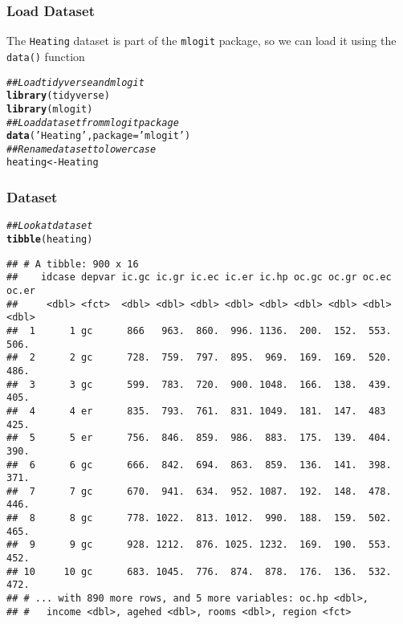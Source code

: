 \documentclass{beamer}\usepackage[]{graphicx}\usepackage[]{color}
\makeatletter
\newcommand{\hlstr}[1]{\textcolor[rgb]{0.192,0.494,0.8}{#1}}%
\newcommand{\hlcom}[1]{\textcolor[rgb]{0.678,0.584,0.686}{\textit{#1}}}%
\newcommand{\hlstd}[1]{\textcolor[rgb]{0.345,0.345,0.345}{#1}}%
\newcommand{\hlkwb}[1]{\textcolor[rgb]{0.69,0.353,0.396}{#1}}%
\newcommand{\hlkwc}[1]{\textcolor[rgb]{0.333,0.667,0.333}{#1}}%
\newcommand{\hlkwd}[1]{\textcolor[rgb]{0.737,0.353,0.396}{\textbf{#1}}}%
\newenvironment{kframe}{%
 \def\at@end@of@kframe{}%
 \ifinner\ifhmode%
  \def\at@end@of@kframe{\end{minipage}}%
  \begin{minipage}{\columnwidth}%
 \fi\fi%
 \def\FrameCommand##1{\hskip\@totalleftmargin \hskip-\fboxsep
 \colorbox{shadecolor}{##1}\hskip-\fboxsep
     \hskip-\linewidth \hskip-\@totalleftmargin \hskip\columnwidth}%
 \MakeFramed {\advance\hsize-\width
   \@totalleftmargin\z@ \linewidth\hsize
   \@setminipage}}%
 {\par\unskip\endMakeFramed%
 \at@end@of@kframe}
\newenvironment{knitrout}{}{} %
\makeatother
\begin{document}
\begin{frame}[fragile]\frametitle{Load Dataset}
    The \texttt{Heating} dataset is part of the \texttt{mlogit} package, so we can load it using the \texttt{data()} function \\
\begin{knitrout}\footnotesize
{}\color{fgcolor}\begin{kframe}
\begin{alltt}
\hlcom{## Load tidyverse and mlogit}
\hlkwd{library}\hlstd{(tidyverse)}
\hlkwd{library}\hlstd{(mlogit)}
\hlcom{## Load dataset from mlogit package}
\hlkwd{data}\hlstd{(}\hlstr{'Heating'}\hlstd{,} \hlkwc{package} \hlstd{=} \hlstr{'mlogit'}\hlstd{)}
\hlcom{## Rename dataset to lowercase}
\hlstd{heating} \hlkwb{<-} \hlstd{Heating}
\end{alltt}
\end{kframe}
\end{knitrout}
\end{frame}

\begin{frame}[fragile]\frametitle{Dataset}
\begin{knitrout}\footnotesize
{}\color{fgcolor}\begin{kframe}
\begin{alltt}
\hlcom{## Look at dataset}
\hlkwd{tibble}\hlstd{(heating)}
\end{alltt}
\begin{verbatim}
## # A tibble: 900 x 16
##    idcase depvar ic.gc ic.gr ic.ec ic.er ic.hp oc.gc oc.gr oc.ec oc.er
##     <dbl> <fct>  <dbl> <dbl> <dbl> <dbl> <dbl> <dbl> <dbl> <dbl> <dbl>
##  1      1 gc      866   963.  860.  996. 1136.  200.  152.  553.  506.
##  2      2 gc      728.  759.  797.  895.  969.  169.  169.  520.  486.
##  3      3 gc      599.  783.  720.  900. 1048.  166.  138.  439.  405.
##  4      4 er      835.  793.  761.  831. 1049.  181.  147.  483   425.
##  5      5 er      756.  846.  859.  986.  883.  175.  139.  404.  390.
##  6      6 gc      666.  842.  694.  863.  859.  136.  141.  398.  371.
##  7      7 gc      670.  941.  634.  952. 1087.  192.  148.  478.  446.
##  8      8 gc      778. 1022.  813. 1012.  990.  188.  159.  502.  465.
##  9      9 gc      928. 1212.  876. 1025. 1232.  169.  190.  553.  452.
## 10     10 gc      683. 1045.  776.  874.  878.  176.  136.  532.  472.
## # ... with 890 more rows, and 5 more variables: oc.hp <dbl>,
## #   income <dbl>, agehed <dbl>, rooms <dbl>, region <fct>
\end{verbatim}
\end{kframe}
\end{knitrout}
\end{frame}
\end{document}
